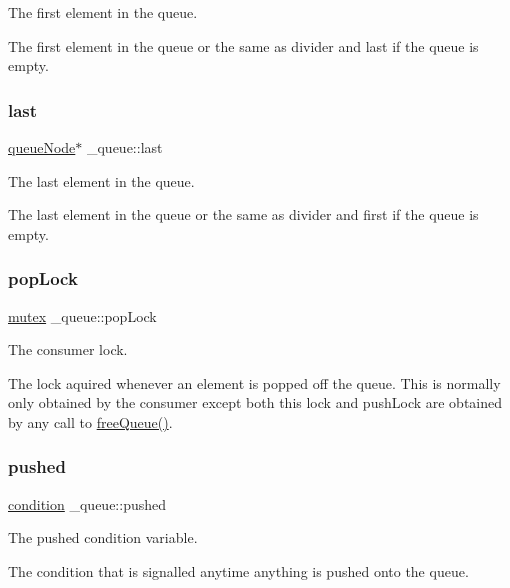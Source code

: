 The first element in the queue. 

The first element in the queue or the same as divider and last if the queue is empty. \mbox{\label{struct__queue_a29b95a909fa3663c0ac1d3d5d60f46cc}} 
\subsubsection{\texorpdfstring{last}{last}}
{\footnotesize\ttfamily \hyperlink{queue_8h_ae1857eedcea35e26ec2c78b7b122b095}{queue\+Node}$\ast$ \+\_\+queue\+::last}



The last element in the queue. 

The last element in the queue or the same as divider and first if the queue is empty. \mbox{\label{struct__queue_ad365cfb038935edc4496f6e5df7f8ee8}} 
\subsubsection{\texorpdfstring{pop\+Lock}{popLock}}
{\footnotesize\ttfamily \hyperlink{queue_8h_a8c80af1d72030a9dc70c3a2c3e46ae9a}{mutex} \+\_\+queue\+::pop\+Lock}



The consumer lock. 

The lock aquired whenever an element is popped off the queue. This is normally only obtained by the consumer except both this lock and push\+Lock are obtained by any call to \hyperlink{queue_8h_aa4727b72ed89cd406d2809482181b959}{free\+Queue()}. \mbox{\label{struct__queue_a1b938cb0b6d5e37e6b8e3715d5bd5c4a}} 
\subsubsection{\texorpdfstring{pushed}{pushed}}
{\footnotesize\ttfamily \hyperlink{queue_8h_a18a0de1af5a8524b75bf94d6b14701b4}{condition} \+\_\+queue\+::pushed}



The pushed condition variable. 

The condition that is signalled anytime anything is pushed onto the queue. \mbox{\label{struct__queue_ae3358baa9df4a511359bbd0c318177e0}} 
